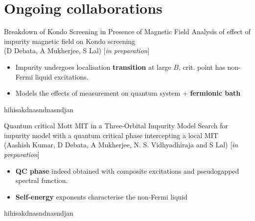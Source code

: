 \documentclass[12pt,aspectratio=169]{beamer}
\newcommand\focus[1]{%
	{\alert{\textbf{#1}}}
}
\begin{document}
\section{Ongoing collaborations}

\begin{frame}{Breakdown of Kondo Screening in Presence of Magnetic Field}
\flushleft
Analysis of effect of impurity magnetic field on Kondo screening \\
(D Debata, A Mukherjee, S Lal) [{\it in preparation}]\\[10pt]

\begin{minipage}{0.55\textwidth}
\begin{itemize}
	\item Impurity undergoes localisation \focus{transition} at large \(B\), crit. point has non-Fermi liquid excitations.
	\item Models the effects of measurement on quantum system $+$ \focus{fermionic bath}
\end{itemize}
\end{minipage}
\begin{minipage}{0.4\textwidth}
	hihisakdnasndnasndjan
\end{minipage}

\end{frame}

\begin{frame}{Quantum critical Mott MIT in a Three-Orbital Impurity Model}
\flushleft
Search for impurity model with a quantum critical phase intercepting a local MIT\\
(Aashish Kumar, D Debata, A Mukherjee, N. S. Vidhyadhiraja and S Lal) [{\it in preparation}]\\[10pt]

\begin{minipage}{0.55\textwidth}
\begin{itemize}
	\item \focus{QC phase} indeed obtained with composite excitations and pseudogapped spectral function.
	\item \focus{Self-energy} exponents characterise the non-Fermi liquid
\end{itemize}
\end{minipage}
\begin{minipage}{0.4\textwidth}
	hihisakdnasndnasndjan
\end{minipage}
\end{frame}
\end{document}
